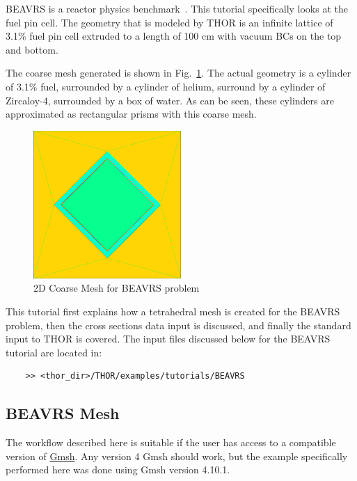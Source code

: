 BEAVRS is a reactor physics benchmark~\cite{BEAVRS}.
This tutorial specifically looks at the fuel pin cell.
The geometry that is modeled by \ac{THOR} is an infinite lattice of 3.1\% fuel pin cell extruded to a length of 100 cm with vacuum BCs on the top and bottom.

The coarse mesh generated is shown in Fig.~\ref{fig:beavrs_2d_mesh}.
The actual geometry is a cylinder of 3.1\% fuel, surrounded by a cylinder of helium, surround by a cylinder of Zircaloy-4, surrounded by a box of water.
As can be seen, these cylinders are approximated as rectangular prisms with this coarse mesh.

\begin{figure}[th]
  \centering
  \includegraphics[width=0.5\textwidth]{chapters/tutorials/figures/beavrs_2d_mesh.png}
  \caption{2D Coarse Mesh for BEAVRS problem}
  \label{fig:beavrs_2d_mesh}
\end{figure}

This tutorial first explains how a tetrahedral mesh is created for the BEAVRS problem, then the cross sections data input is discussed, and finally the standard input to \ac{THOR} is covered.
The input files discussed below for the BEAVRS tutorial are located in:
\begin{verbatim}
    >> <thor_dir>/THOR/examples/tutorials/BEAVRS
\end{verbatim}

\subsection{BEAVRS Mesh}\label{ch:tuts:sec:beavrs:ssec:mesh}

The workflow described here is suitable if the user has access to a compatible version of \href{https://gmsh.info/}{Gmsh}.
Any version 4 Gmsh should work, but the example specifically performed here was done using Gmsh version 4.10.1.

